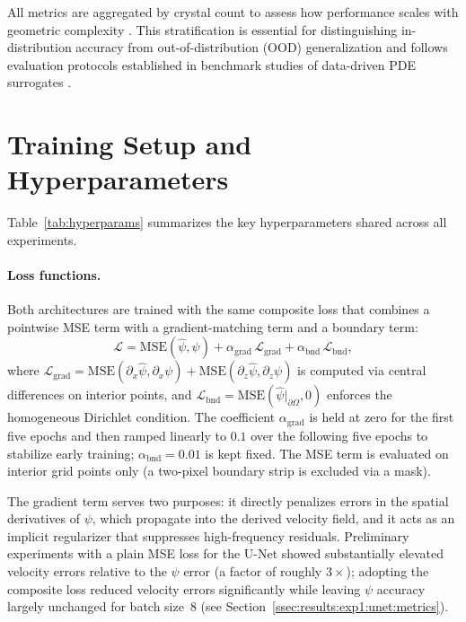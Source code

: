 All metrics are aggregated by crystal count to assess how performance scales with geometric complexity \parencite{morimoto_generalization_2022}. This stratification is essential for distinguishing in-distribution accuracy from out-of-distribution (OOD) generalization and follows evaluation protocols established in benchmark studies of data-driven PDE surrogates \parencite{takamoto_pdebench_nodate,lu_comprehensive_2022}.

\section{Training Setup and Hyperparameters}
\label{sec:experiments:setup}

Table~\ref{tab:hyperparams} summarizes the key hyperparameters shared across all experiments.

\paragraph{Loss functions.}
Both architectures are trained with the same composite loss that combines a pointwise MSE term with a gradient-matching term and a boundary term:
\begin{equation}
    \mathcal{L} = \mathrm{MSE}(\hat{\psi}, \psi)
        + \alpha_{\mathrm{grad}}\,\mathcal{L}_{\mathrm{grad}}
        + \alpha_{\mathrm{bnd}}\,\mathcal{L}_{\mathrm{bnd}},
\end{equation}
where $\mathcal{L}_{\mathrm{grad}} = \mathrm{MSE}(\partial_x\hat{\psi},\partial_x\psi) + \mathrm{MSE}(\partial_z\hat{\psi},\partial_z\psi)$ is computed via central differences on interior points, and $\mathcal{L}_{\mathrm{bnd}} = \mathrm{MSE}(\hat{\psi}|_{\partial\Omega}, 0)$ enforces the homogeneous Dirichlet condition. The coefficient $\alpha_{\mathrm{grad}}$ is held at zero for the first five epochs and then ramped linearly to $0.1$ over the following five epochs to stabilize early training; $\alpha_{\mathrm{bnd}} = 0.01$ is kept fixed. The MSE term is evaluated on interior grid points only (a two-pixel boundary strip is excluded via a mask).

The gradient term serves two purposes: it directly penalizes errors in the spatial derivatives of $\psi$, which propagate into the derived velocity field, and it acts as an implicit regularizer that suppresses high-frequency residuals. Preliminary experiments with a plain MSE loss for the U-Net showed substantially elevated velocity errors relative to the $\psi$ error (a factor of roughly $3\times$); adopting the composite loss reduced velocity errors significantly while leaving $\psi$ accuracy largely unchanged for batch size~8 (see Section~\ref{ssec:results:exp1:unet:metrics}).


